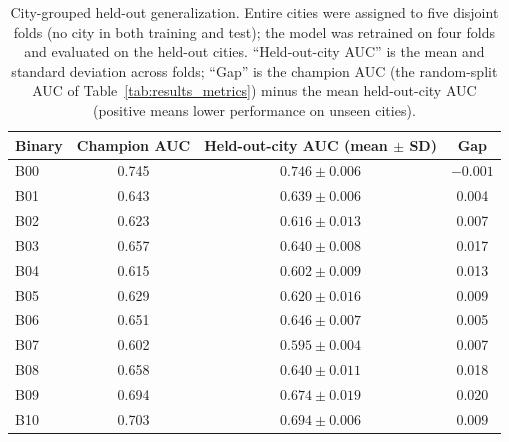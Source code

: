 \documentclass[utf8]{FrontiersinHarvard} %
\begin{document}
\begin{table}[t]
\centering
\caption{City-grouped held-out generalization. Entire cities were assigned to five disjoint folds (no city in both training and test); the model was retrained on four folds and evaluated on the held-out cities. ``Held-out-city AUC'' is the mean and standard deviation across folds; ``Gap'' is the champion AUC (the random-split AUC of Table~\ref{tab:results_metrics}) minus the mean held-out-city AUC (positive means lower performance on unseen cities).}
\label{tab:location_loco}
\footnotesize
\setlength{\tabcolsep}{6pt}
\renewcommand{\arraystretch}{1.15}
\begin{tabular}{@{}l c c c@{}}
\toprule
\textbf{Binary} & \textbf{Champion AUC} & \textbf{Held-out-city AUC (mean $\pm$ SD)} & \textbf{Gap} \\
\midrule
B00 & 0.745 & $0.746 \pm 0.006$ & $-0.001$ \\
B01 & 0.643 & $0.639 \pm 0.006$ & 0.004 \\
B02 & 0.623 & $0.616 \pm 0.013$ & 0.007 \\
B03 & 0.657 & $0.640 \pm 0.008$ & 0.017 \\
B04 & 0.615 & $0.602 \pm 0.009$ & 0.013 \\
B05 & 0.629 & $0.620 \pm 0.016$ & 0.009 \\
B06 & 0.651 & $0.646 \pm 0.007$ & 0.005 \\
B07 & 0.602 & $0.595 \pm 0.004$ & 0.007 \\
B08 & 0.658 & $0.640 \pm 0.011$ & 0.018 \\
B09 & 0.694 & $0.674 \pm 0.019$ & 0.020 \\
B10 & 0.703 & $0.694 \pm 0.006$ & 0.009 \\
\bottomrule
\end{tabular}
\end{table}
\end{document}
